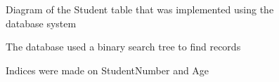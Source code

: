 \documentclass[12pt]{article}
\newcommand\nocaption[1]{\newline\footnotesize\sffamily #1}
\begin{document}
\begin{figure}[ht]
  \centering
  \nocaption{Diagram of the Student table that was implemented using the database system}
    \label{fig:rdb-2}
\end{figure}
\begin{figure}
\centering
    \nocaption{The database used a binary search tree to find records}
    \label{fig:rdb-1}
\end{figure}
\begin{figure}
\centering
    \nocaption{Indices were made on StudentNumber and Age}
    \label{fig:rdb-3}
\end{figure}
\end{document}
